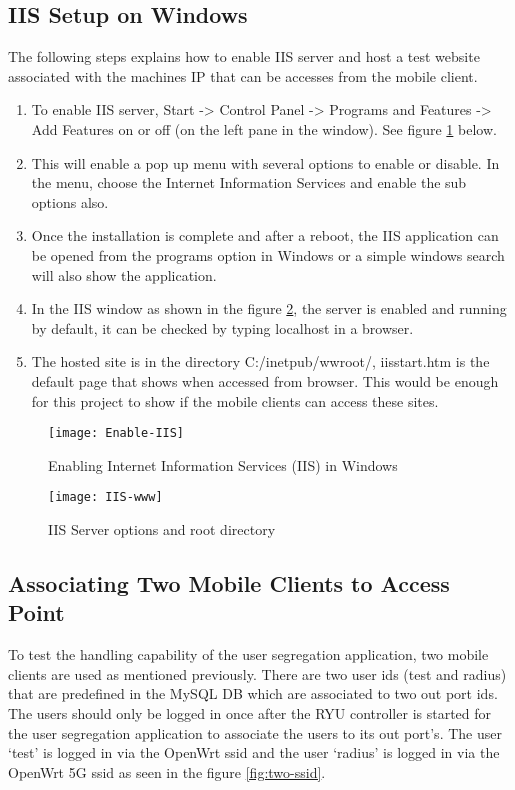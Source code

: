 \subsection{IIS Setup on Windows}
The following steps explains how to enable IIS server and host a test website associated with the machines IP that can be accesses from the mobile client.

\begin{enumerate}
	\item To enable IIS server, Start -> Control Panel -> Programs and Features -> Add Features on or off (on the left pane in the window). See figure \ref{fig:enable_iis} below.
	\item This will enable a pop up menu with several options to enable or disable. In the menu, choose the Internet Information Services and enable the sub options also.
	\item Once the installation is complete and after a reboot, the IIS application can be opened from the programs option in Windows or a simple windows search will also show the application.
	\item In the IIS window as shown in the figure \ref{fig:iis-www}, the server is enabled and running by default, it can be checked by typing localhost in a browser.
	\item The hosted site is in the directory C:/inetpub/wwroot/, iisstart.htm is the default page that shows when accessed from browser. This would be enough for this project to show if the mobile clients can access these sites.
	
\end{enumerate}
  \begin{figure}[H]
	\centering
	\texttt{[image: Enable-IIS]}
	\caption {Enabling Internet Information Services (IIS) in Windows}
	\label{fig:enable_iis}
	\vspace{-10pt}
  \end{figure}
  \begin{figure}[H]
	\centering
	\texttt{[image: IIS-www]}
	\caption {IIS Server options and root directory}
	\label{fig:iis-www}
	\vspace{-10pt}
  \end{figure}
\subsection{Associating Two Mobile Clients to Access Point}
To test the handling capability of the user segregation application, two mobile clients are used as mentioned previously. There are two user ids (test and radius) that are predefined in the MySQL DB which are associated to two out port ids. The users should only be logged in once after the RYU controller is started for the user segregation application to associate the users to its out port’s. The user ‘test’ is logged in via the OpenWrt ssid and the user ‘radius’ is logged in via the OpenWrt 5G ssid as seen in the figure \ref{fig:two-ssid}.
